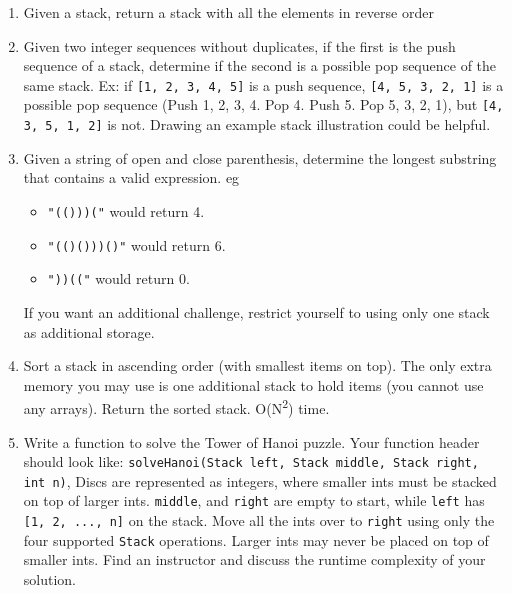 \documentclass{article}
\begin{document}
\begin{enumerate}

\item Given a stack, return a stack with all the elements in reverse order

\item Given two integer sequences without duplicates, if the first is the push sequence of a stack, determine if the second is a possible pop sequence of the same stack. Ex: if \texttt{[1, 2, 3, 4, 5]} is a push sequence, \texttt{[4, 5, 3, 2, 1]} is a possible pop sequence (Push 1, 2, 3, 4. Pop 4. Push 5. Pop 5, 3, 2, 1), but \texttt{[4, 3, 5, 1, 2]} is not. Drawing an example stack illustration could be helpful.

\item Given a string of open and close parenthesis, determine the longest substring that contains a valid expression. eg
\begin{itemize}
  \item \texttt{"(()))("} would return 4.
  \item \texttt{"(()()))()"} would return 6.
  \item \texttt{"))(("} would return 0. 
\end{itemize}
If you want an additional challenge, restrict yourself to using only one stack as additional storage.

\item Sort a stack in ascending order (with smallest items on top). The only extra memory you may use is one additional stack to hold items (you cannot use any arrays). Return the sorted stack. O(N\textsuperscript{2}) time.

\item Write a function to solve the Tower of Hanoi puzzle. Your function header should look like: \texttt{solveHanoi(Stack left, Stack middle, Stack right, int n)}, Discs are represented as integers, where smaller ints must be stacked on top of larger ints. \texttt{middle}, and \texttt{right} are empty to start, while \texttt{left} has \texttt{[1, 2, ..., n]} on the stack. Move all the ints over to \texttt{right} using only the four supported \texttt{Stack} operations. Larger ints may never be placed on top of smaller ints. Find an instructor and discuss the runtime complexity of your solution.
\end{enumerate}


\clearpage
\end{document}
